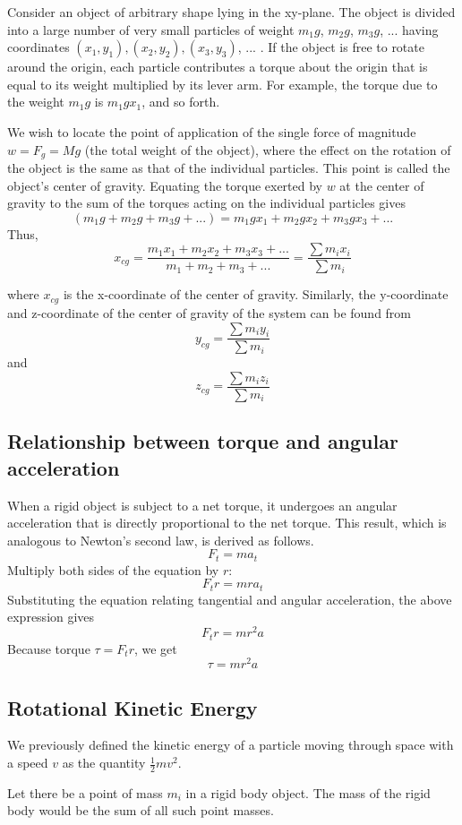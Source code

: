 Consider an object of arbitrary shape lying in the xy-plane. The object is divided into a large number of very small particles of weight $m_1g$, $m_2g$, $m_3g$, ... having coordinates $(x_1, y_1), (x_2, y_2), (x_3, y_3)$, ... . If the object is free to rotate around the origin, each particle contributes a torque about the origin that is equal to its weight multiplied by its lever arm. For example, the torque due to the weight $m_1g$ is $m_1gx_1$, and so forth.

We wish to locate the point of application of the single force of magnitude $w=F_g=Mg$ (the total weight of the object), where the effect on the rotation of the object is the same as that of the individual particles. This point is called the object's center of gravity. Equating the torque exerted by $w$ at the center of gravity to the sum of the torques acting on the individual particles gives
$$(m_1g + m_2g + m_3g + ...)=m_1gx_1 + m_2gx_2 + m_3gx_3+ ...$$
Thus,
$$x_{cg} = \frac{m_1x_1 + m_2x_2 + m_3x_3 + ...}{m_1 + m_2 + m_3 + ...} = \frac{\sum{m_ix_i}}{\sum m_i}$$

where $x_{cg}$ is the x-coordinate of the center of gravity. Similarly, the y-coordinate and z-coordinate of the center of gravity of the system can be found from
$$y_{cg}= \frac{\sum{m_iy_i}}{\sum{m_i}}$$
and
$$z_{cg} = \frac{\sum{m_iz_i}}{\sum{m_i}}$$

\subsection{Relationship between torque and angular acceleration}
When a rigid object is subject to a net torque, it undergoes an angular acceleration that is directly proportional to the net torque. This result, which is analogous to Newton's second law, is derived as follows.
$$F_t = ma_t$$
Multiply both sides of the equation by $r$:
$$F_tr = mra_t$$
Substituting the equation relating tangential and angular acceleration, the above expression gives
$$F_tr = mr^2a$$
Because torque $\tau = F_tr$, we get
$$\tau = mr^2a$$

\subsection{Rotational Kinetic Energy}
We previously defined the kinetic energy of a particle moving through space with a speed $v$ as the quantity $\frac{1}{2}mv^2$. 

Let there be a point of mass $m_i$ in a rigid body object. The mass of the rigid body would be the sum of all such point masses. 


